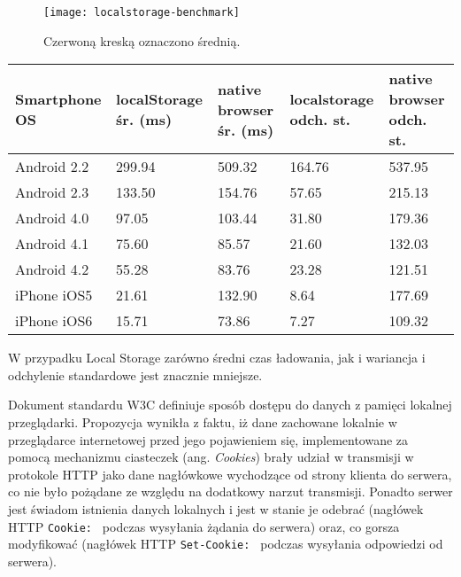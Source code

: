 \begin{figure}[h!]
  \caption[Porównanie czasu ładowania danych z cache przeglądarki oraz Web Storage]{Czerwoną kreską oznaczono średnią.}
  \centering
    \texttt{[image: localstorage-benchmark]}
\end{figure}

\begin{center}
    \begin{tabular}{ | l | p{2.5cm} | p{2.5cm} | p{2.5cm} | p{2.5cm} |}
    \hline
	Smartphone OS & localStorage \newline śr. (ms) & native browser \newline śr. (ms) & localstorage \newline odch. st. & native browser \newline odch. st. \\ \hline
	Android 2.2 & 299.94 & 509.32 & 164.76 & 537.95 \\ \hline
	Android 2.3 & 133.50 & 154.76 & 57.65 & 215.13 \\ \hline
	Android 4.0 & 97.05 & 103.44 & 31.80 & 179.36 \\ \hline
	Android 4.1 & 75.60 & 85.57 & 21.60 & 132.03 \\ \hline
	Android 4.2 & 55.28 & 83.76 & 23.28 & 121.51 \\ \hline
	iPhone iOS5 & 21.61 & 132.90 & 8.64 & 177.69 \\ \hline
	iPhone iOS6 & 15.71 & 73.86 & 7.27 & 109.32 \\ \hline
    \hline
    \end{tabular}
\end{center}

W przypadku Local Storage zarówno średni czas ładowania, jak i wariancja i odchylenie standardowe jest znacznie mniejsze.

Dokument standardu W3C\cite{webstorage} definiuje sposób dostępu do danych z pamięci lokalnej przeglądarki. Propozycja wynikła z faktu, iż dane zachowane lokalnie w przeglądarce internetowej przed jego pojawieniem się, implementowane za pomocą mechanizmu ciasteczek (ang. \emph{Cookies}) brały udział w transmisji w protokole HTTP jako dane nagłówkowe wychodzące od strony klienta do serwera, co nie było pożądane ze względu na dodatkowy narzut transmisji. Ponadto serwer jest świadom istnienia danych lokalnych i jest w stanie je odebrać (nagłówek HTTP \lstinline{Cookie: } podczas wysyłania żądania do serwera) oraz, co gorsza modyfikować (nagłówek HTTP \lstinline{Set-Cookie: } podczas wysyłania odpowiedzi od serwera).

